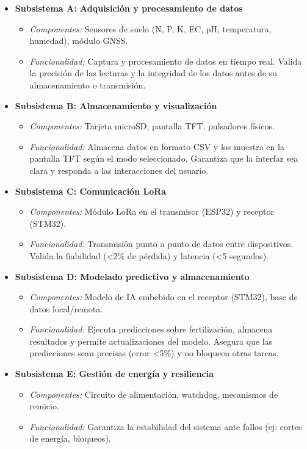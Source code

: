 \documentclass[12pt,a4paper, twosite]{article}
\begin{document}
\begin{itemize}
  \item \textbf{Subsistema A: Adquisición y procesamiento de datos}
  \begin{itemize}
    \item \textit{Componentes:} Sensores de suelo (N, P, K, EC, pH, temperatura, humedad), módulo GNSS.
    \item \textit{Funcionalidad:} Captura y procesamiento de datos en tiempo real. Valida la precisión de las lecturas y la integridad de los datos antes de su almacenamiento o transmisión.
  \end{itemize}
  
  \item \textbf{Subsistema B: Almacenamiento y visualización}
  \begin{itemize}
    \item \textit{Componentes:} Tarjeta microSD, pantalla TFT, pulsadores físicos.
    \item \textit{Funcionalidad:} Almacena datos en formato CSV y los muestra en la pantalla TFT según el modo seleccionado. Garantiza que la interfaz sea clara y responda a las interacciones del usuario.
  \end{itemize}
  
  \item \textbf{Subsistema C: Comunicación LoRa}
  \begin{itemize}
    \item \textit{Componentes:} Módulo LoRa en el transmisor (ESP32) y receptor (STM32).
    \item \textit{Funcionalidad:} Transmisión punto a punto de datos entre dispositivos. Valida la fiabilidad (<2\% de pérdida) y latencia (<5 segundos).
  \end{itemize}
  
  \item \textbf{Subsistema D: Modelado predictivo y almacenamiento}
  \begin{itemize}
    \item \textit{Componentes:} Modelo de IA embebido en el receptor (STM32), base de datos local/remota.
    \item \textit{Funcionalidad:} Ejecuta predicciones sobre fertilización, almacena resultados y permite actualizaciones del modelo. Asegura que las predicciones sean precisas (error <5\%) y no bloqueen otras tareas.
  \end{itemize}
  
  \item \textbf{Subsistema E: Gestión de energía y resiliencia}
  \begin{itemize}
    \item \textit{Componentes:} Circuito de alimentación, watchdog, mecanismos de reinicio.
    \item \textit{Funcionalidad:} Garantiza la estabilidad del sistema ante fallos (ej: cortes de energía, bloqueos).
  \end{itemize}
\end{itemize}
\end{document}
